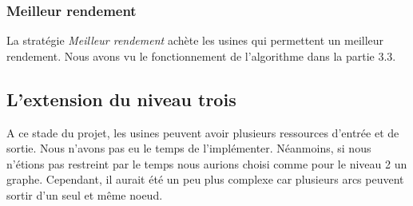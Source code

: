 \subsubsection{Meilleur rendement}
 
La stratégie \textit{Meilleur rendement} achète les usines qui permettent un meilleur rendement. Nous avons vu le fonctionnement de l'algorithme dans la partie 3.3.\\
\smallbreak

\subsection{L'extension du niveau trois}

A ce stade du projet, les usines peuvent avoir plusieurs ressources d'entrée et de sortie. Nous n'avons pas eu le temps de l'implémenter. Néanmoins, si nous n'étions pas restreint par le temps nous aurions choisi comme pour le niveau 2 un graphe. Cependant, il aurait été un peu plus complexe car plusieurs arcs peuvent sortir d'un seul et même noeud. 
 